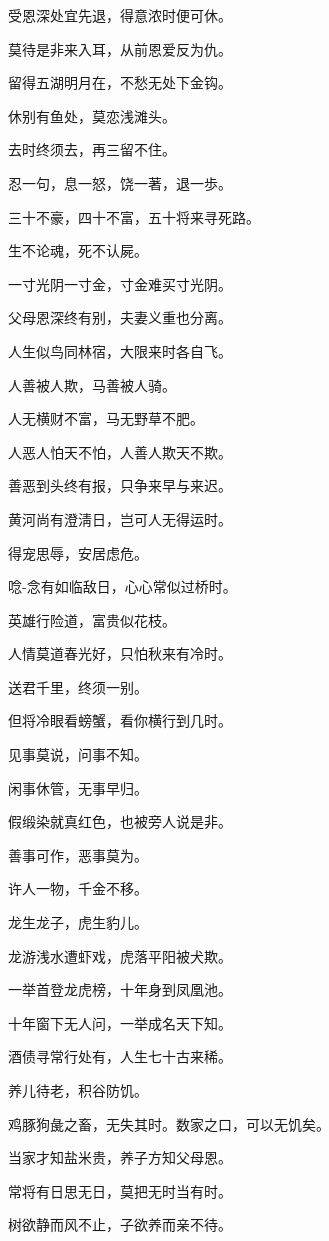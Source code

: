 \documentclass[12pt,oneside]{book}
\begin{document}
受恩深处宜先退，得意浓时便可休。

莫待是非来入耳，从前恩爱反为仇。

留得五湖明月在，不愁无处下金钩。

休别有鱼处，莫恋浅滩头。

去时终须去，再三留不住。

忍一句，息一怒，饶一著，退一歩。

三十不豪，四十不富，五十将来寻死路。

生不论魂，死不认屍。

一寸光阴一寸金，寸金难买寸光阴。

父母恩深终有别，夫妻义重也分离。

人生似鸟同林宿，大限来时各自飞。

人善被人欺，马善被人骑。

人无横财不富，马无野草不肥。

人恶人怕天不怕，人善人欺天不欺。

善恶到头终有报，只争来早与来迟。

黄河尚有澄淸日，岂可人无得运时。

得宠思辱，安居虑危。

唸-{念}有如临敌日，心心常似过桥时。

英雄行险道，富贵似花枝。

人情莫道春光好，只怕秋来有冷时。

送君千里，终须一别。

但将冷眼看螃蟹，看你横行到几时。

见事莫说，问事不知。

闲事休管，无事早归。

假缎染就真红色，也被旁人说是非。

善事可作，恶事莫为。

许人一物，千金不移。

龙生龙子，虎生豹儿。

龙游浅水遭虾戏，虎落平阳被犬欺。

一举首登龙虎榜，十年身到凤凰池。

十年窗下无人问，一举成名天下知。

酒债寻常行处有，人生七十古来稀。

养儿待老，积谷防饥。

鸡豚狗彘之畜，无失其时。数家之口，可以无饥矣。

当家才知盐米贵，养子方知父母恩。

常将有日思无日，莫把无时当有时。

树欲静而风不止，子欲养而亲不待。
\end{document}
